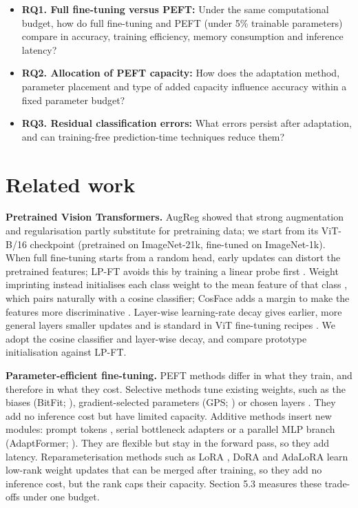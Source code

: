\begin{itemize}
\item
  \textbf{RQ1. Full fine-tuning versus PEFT:} Under the same computational budget, how do full fine-tuning and PEFT (under 5\% trainable parameters) compare in accuracy, training efficiency, memory consumption and inference latency?
\item
  \textbf{RQ2. Allocation of PEFT capacity:} How does the adaptation method, parameter placement and type of added capacity influence accuracy within a fixed parameter budget?
\item
  \textbf{RQ3. Residual classification errors:} What errors persist after adaptation, and can training-free prediction-time techniques reduce them?
\end{itemize}

\section{Related work}\label{related-work}

\textbf{Pretrained Vision Transformers.} AugReg \citep{steiner2022augreg} showed that strong augmentation and regularisation partly substitute for pretraining data; we start from its ViT-B/16 checkpoint (pretrained on ImageNet-21k, fine-tuned on ImageNet-1k). When full fine-tuning starts from a random head, early updates can distort the pretrained features; LP-FT avoids this by training a linear probe first \citep{kumar2022lpft}. Weight imprinting instead initialises each class weight to the mean feature of that class \citep{qi2018imprinting}, which pairs naturally with a cosine classifier; CosFace adds a margin to make the features more discriminative \citep{wang2018cosface}. Layer-wise learning-rate decay gives earlier, more general layers smaller updates and is standard in ViT fine-tuning recipes \citep{he2022mae}. We adopt the cosine classifier and layer-wise decay, and compare prototype initialisation against LP-FT.

\textbf{Parameter-efficient fine-tuning.} PEFT methods differ in what they train, and therefore in what they cost. Selective methods tune existing weights, such as the biases (BitFit; \citealp{zaken2022bitfit}), gradient-selected parameters (GPS; \citealp{zhang2024gps}) or chosen layers \citep{lee2023surgical}. They add no inference cost but have limited capacity. Additive methods insert new modules: prompt tokens \citep{li2021prefix,jia2022vpt}, serial bottleneck adapters \citep{houlsby2019adapter} or a parallel MLP branch (AdaptFormer; \citealp{chen2022adaptformer}). They are flexible but stay in the forward pass, so they add latency. Reparameterisation methods such as LoRA \citep{hu2022lora}, DoRA \citep{liu2024dora} and AdaLoRA \citep{zhang2023adalora} learn low-rank weight updates that can be merged after training, so they add no inference cost, but the rank caps their capacity. Section 5.3 measures these trade-offs under one budget.


